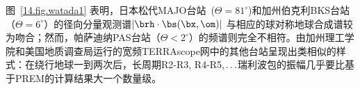 图~\ref{14.fig.watada1} 表明，日本松代MAJO台站~($\Theta=81^{\circ}$)和加州伯克利BKS台站（$\Theta=6^{\circ}$）的径向分量观测谱$|\brh\cdot\bs(\bx,\om)|$ 与相应的球对称地球合成谱较为吻合；然而，帕萨迪纳PAS台站（$\Theta<2^{\circ}$）的频谱则完全不相符。由加州理工学院和美国地质调查局运行的宽频TERRAscope网中的其他台站呈现出类相似的样式：在绕行地球一到两次后，长周期R2\hspace{0.3 mm}-R3,
R4\hspace{0.4 mm}-R5,$\hspace{0.3mm}\ldots$瑞利波包的振幅几乎要比基于PREM的计算结果大一个数量级。
